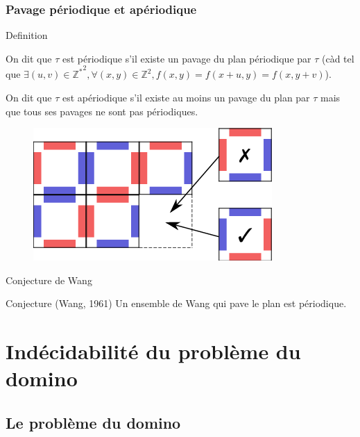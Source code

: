 \documentclass{beamer}
\newcommand{\Z}{\mathbb Z}
\begin{document}
\begin{frame}
\frametitle{Pavage périodique et apériodique}

\begin{alertblock}{Definition}

On dit que $\tau$ est périodique s'il existe un pavage du plan périodique par $\tau$
(càd tel que $\exists (u,v) \in {\Z^*}^2, \forall (x,y) \in \Z^2, f(x,y) = f(x+u,y)=f(x,y+v)$).

On dit que $\tau$ est apériodique s'il existe au moins un pavage du plan par $\tau$ mais que tous ses pavages ne sont pas périodiques.
    
\end{alertblock}

\begin{figure}

    \includegraphics[scale = 0.5]{pavage_periodique}
    \centering
    
\end{figure}

\end{frame}

\begin{frame}{Conjecture de Wang}

    \begin{block}{Conjecture (Wang, 1961)}
        Un ensemble de Wang qui pave le plan est périodique.
    \end{block}
    
    \end{frame}
    
\section{Indécidabilité du problème du domino}

\subsection{Le problème du domino}
\end{document}
